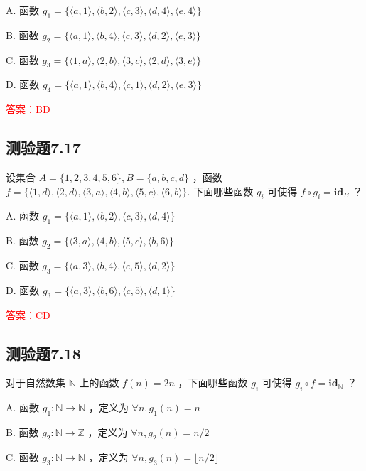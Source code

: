 \documentclass[UTF8, heading=true]{ctexart}
\begin{document}
A. 函数 $g_1=\{\langle a, 1\rangle,\langle b, 2\rangle,\langle c, 3\rangle,\langle d, 4\rangle,\langle e, 4\rangle\}$

B. 函数 $g_2=\{\langle a, 1\rangle,\langle b, 4\rangle,\langle c, 3\rangle,\langle d, 2\rangle,\langle e, 3\rangle\}$

C. 
函数 $g_3=\{\langle 1, a\rangle,\langle 2, b\rangle,\langle 3, c\rangle,\langle 2, d\rangle,\langle 3, e\rangle\}$

D. 
函数 $g_4=\{\langle a, 1\rangle,\langle b, 4\rangle,\langle c, 1\rangle,\langle d, 2\rangle,\langle e, 3\rangle\}$


\textcolor{red}{答案：BD}

\subsection{测验题7.17}

设集合 $A=\{1,2,3,4,5,6\}, B=\{a, b, c, d\}$ ，函数 $f=\{\langle 1, d\rangle,\langle 2, d\rangle,\langle 3, a\rangle,\langle 4, b\rangle,\langle 5, c\rangle,\langle 6, b\rangle\}$. 下面哪些函数 $g_i$ 可使得 $f \circ g_i=\mathbf{i d}_B$ ？

A. 函数 $g_1=\{\langle a, 1\rangle,\langle b, 2\rangle,\langle c, 3\rangle,\langle d, 4\rangle\}$

B. 函数 $g_2=\{\langle 3, a\rangle,\langle 4, b\rangle,\langle 5, c\rangle,\langle b, 6\rangle\}$

C. 函数 $g_3=\{\langle a, 3\rangle,\langle b, 4\rangle,\langle c, 5\rangle,\langle d, 2\rangle\}$

D. 函数 $g_3=\{\langle a, 3\rangle,\langle b, 6\rangle,\langle c, 5\rangle,\langle d, 1\rangle\}$


\textcolor{red}{答案：CD}

\subsection{测验题7.18}

对于自然数集 $\mathbb{N}$ 上的函数 $f(n)=2 n$ ，下面哪些函数 $g_i$ 可使得 $g_i \circ f=\mathbf{i d}_{\mathbb{N}}$ ？

A. 函数 $g_1: \mathbb{N} \rightarrow \mathbb{N}$ ，定义为 $\forall n, g_1(n)=n$

B. 函数 $g_2: \mathbb{N} \rightarrow \mathbb{Z}$ ，定义为 $\forall n, g_2(n)=n / 2$

C. 函数 $g_3: \mathbb{N} \rightarrow \mathbb{N}$ ，定义为 $\forall n, g_3(n)=\lfloor n / 2\rfloor$
\end{document}
